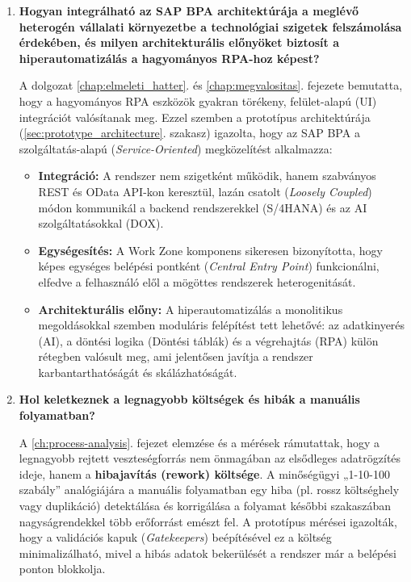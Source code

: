\begin{enumerate}
    \item \textbf{Hogyan integrálható az SAP BPA architektúrája a meglévő heterogén vállalati környezetbe a technológiai szigetek felszámolása érdekében, és milyen architekturális előnyöket biztosít a hiperautomatizálás a hagyományos RPA-hoz képest?}
    
    A dolgozat \ref{chap:elmeleti_hatter}. és \ref{chap:megvalositas}. fejezete bemutatta, hogy a hagyományos RPA eszközök gyakran törékeny, felület-alapú (UI) integrációt valósítanak meg. Ezzel szemben a prototípus architektúrája (\ref{sec:prototype_architecture}. szakasz) igazolta, hogy az SAP BPA a szolgáltatás-alapú (\textit{Service-Oriented}) megközelítést alkalmazza:
    
    \begin{itemize}
        \item \textbf{Integráció:} A rendszer nem szigetként működik, hanem szabványos REST és OData API-kon keresztül, lazán csatolt (\textit{Loosely Coupled}) módon kommunikál a backend rendszerekkel (S/4HANA) és az AI szolgáltatásokkal (DOX).
        \item \textbf{Egységesítés:} A Work Zone komponens sikeresen bizonyította, hogy képes egységes belépési pontként (\textit{Central Entry Point}) funkcionálni, elfedve a felhasználó elől a mögöttes rendszerek heterogenitását.
        \item \textbf{Architekturális előny:} A hiperautomatizálás a monolitikus megoldásokkal szemben moduláris felépítést tett lehetővé: az adatkinyerés (AI), a döntési logika (Döntési táblák) és a végrehajtás (RPA) külön rétegben valósult meg, ami jelentősen javítja a rendszer karbantarthatóságát és skálázhatóságát.
    \end{itemize}

    \item \textbf{Hol keletkeznek a legnagyobb költségek és hibák a manuális folyamatban?}
    
    A \ref{ch:process-analysis}. fejezet elemzése és a mérések rámutattak, hogy a legnagyobb rejtett veszteségforrás nem önmagában az elsődleges adatrögzítés ideje, hanem a \textbf{hibajavítás (rework) költsége}. A minőségügyi „1-10-100 szabály” analógiájára a manuális folyamatban egy hiba (pl. rossz költséghely vagy duplikáció) detektálása és korrigálása a folyamat későbbi szakaszában nagyságrendekkel több erőforrást emészt fel. A prototípus mérései igazolták, hogy a validációs kapuk (\textit{Gatekeepers}) beépítésével ez a költség minimalizálható, mivel a hibás adatok bekerülését a rendszer már a belépési ponton blokkolja.


\end{enumerate}
